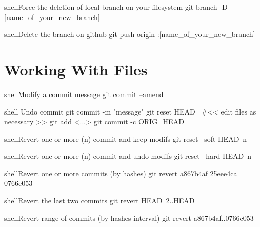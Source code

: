 \documentclass[10pt,a4paper]{article}
\begin{document}
\begin{multicols}{3}
\begin{codebox}{shell}{Force the deletion of local branch on your filesystem}
git branch -D [name_of_your_new_branch]

\end{codebox}

\begin{codebox}{shell}{Delete the branch on github}
git push origin :[name_of_your_new_branch]

\end{codebox}

\section{Working With Files}

\begin{codebox}{shell}{Modify a commit message}
git commit --amend

\end{codebox}

\begin{codebox}{shell}{}
Undo commit
git commit -m "message"
git reset HEAD~
#<< edit files as necessary >>
git add <...>
git commit -c ORIG_HEAD

\end{codebox}

\begin{codebox}{shell}{Revert one or more (n) commit and keep modifs}
git reset --soft HEAD~n

\end{codebox}

\begin{codebox}{shell}{Revert one or more (n) commit and undo modifs}
git reset --hard HEAD~n

\end{codebox}

\begin{codebox}{shell}{Revert one or more commits (by hashes)}
git revert a867b4af 25eee4ca 0766c053

\end{codebox}

\begin{codebox}{shell}{Revert the last two commits}
git revert HEAD~2..HEAD

\end{codebox}

\begin{codebox}{shell}{Revert range of commits (by hashes interval)}
git revert a867b4af..0766c053


\end{codebox}
\end{multicols}
\end{document}
